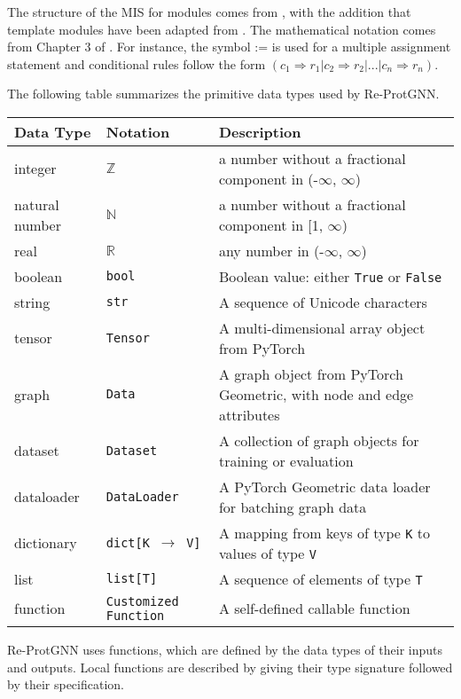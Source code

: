 \documentclass[12pt, titlepage]{article}
\begin{document}
The structure of the MIS for modules comes from \citet{HoffmanAndStrooper1995},
with the addition that template modules have been adapted from
\cite{GhezziEtAl2003}.  The mathematical notation comes from Chapter 3 of
\citet{HoffmanAndStrooper1995}.  For instance, the symbol := is used for a
multiple assignment statement and conditional rules follow the form $(c_1
\Rightarrow r_1 | c_2 \Rightarrow r_2 | ... | c_n \Rightarrow r_n )$.

The following table summarizes the primitive data types used by Re-ProtGNN. 

\begin{center}
\renewcommand{\arraystretch}{1.2}
\noindent 
\begin{tabular}{l l p{7.5cm}} 
\toprule 
\textbf{Data Type} & \textbf{Notation} & \textbf{Description}\\ 
\midrule
integer & $\mathbb{Z}$ & a number without a fractional component in (-$\infty$, $\infty$) \\
natural number & $\mathbb{N}$ & a number without a fractional component in [1, $\infty$) \\
real & $\mathbb{R}$ & any number in (-$\infty$, $\infty$)\\
boolean & \texttt{bool} & Boolean value: either \texttt{True} or \texttt{False} \\
string & \texttt{str} & A sequence of Unicode characters \\
tensor & \texttt{Tensor} & A multi-dimensional array object from PyTorch \\
graph & \texttt{Data} & A graph object from PyTorch Geometric, with node and edge attributes \\
dataset & \texttt{Dataset} & A collection of graph objects for training or evaluation \\
dataloader & \texttt{DataLoader} & A PyTorch Geometric data loader for batching graph data \\
dictionary & \texttt{dict[K $\rightarrow{}$ V]} & A mapping from keys of type \texttt{K} to values of type \texttt{V} \\
list & \texttt{list[T]} & A sequence of elements of type \texttt{T} \\
function & \texttt{Customized Function} & A self-defined callable function\\
\bottomrule
\end{tabular} 
\end{center}

\noindent
Re-ProtGNN uses functions, which
are defined by the data types of their inputs and outputs. Local functions are
described by giving their type signature followed by their specification.
\end{document}
